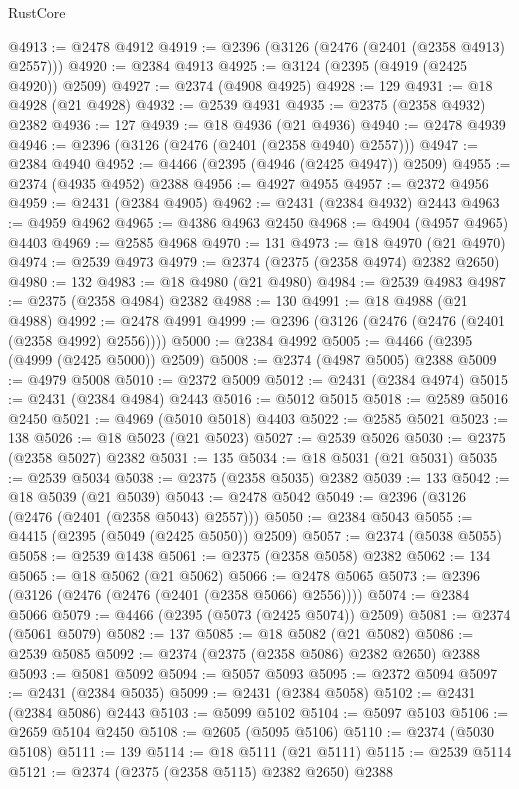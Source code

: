 \begin{lexlean}{RustCore}
\begin{coremodule}
@4913 := @2478 @4912
@4919 := @2396 (@3126 (@2476 (@2401 (@2358 @4913) @2557)))
@4920 := @2384 @4913
@4925 := @3124 (@2395 (@4919 (@2425 @4920)) @2509)
@4927 := @2374 (@4908 @4925)
@4928 := 129
@4931 := @18 @4928 (@21 @4928)
@4932 := @2539 @4931
@4935 := @2375 (@2358 @4932) @2382
@4936 := 127
@4939 := @18 @4936 (@21 @4936)
@4940 := @2478 @4939
@4946 := @2396 (@3126 (@2476 (@2401 (@2358 @4940) @2557)))
@4947 := @2384 @4940
@4952 := @4466 (@2395 (@4946 (@2425 @4947)) @2509)
@4955 := @2374 (@4935 @4952) @2388
@4956 := @4927 @4955
@4957 := @2372 @4956
@4959 := @2431 (@2384 @4905)
@4962 := @2431 (@2384 @4932) @2443
@4963 := @4959 @4962
@4965 := @4386 @4963 @2450
@4968 := @4904 (@4957 @4965) @4403
@4969 := @2585 @4968
@4970 := 131
@4973 := @18 @4970 (@21 @4970)
@4974 := @2539 @4973
@4979 := @2374 (@2375 (@2358 @4974) @2382 @2650)
@4980 := 132
@4983 := @18 @4980 (@21 @4980)
@4984 := @2539 @4983
@4987 := @2375 (@2358 @4984) @2382
@4988 := 130
@4991 := @18 @4988 (@21 @4988)
@4992 := @2478 @4991
@4999 := @2396 (@3126 (@2476 (@2476 (@2401 (@2358 @4992) @2556))))
@5000 := @2384 @4992
@5005 := @4466 (@2395 (@4999 (@2425 @5000)) @2509)
@5008 := @2374 (@4987 @5005) @2388
@5009 := @4979 @5008
@5010 := @2372 @5009
@5012 := @2431 (@2384 @4974)
@5015 := @2431 (@2384 @4984) @2443
@5016 := @5012 @5015
@5018 := @2589 @5016 @2450
@5021 := @4969 (@5010 @5018) @4403
@5022 := @2585 @5021
@5023 := 138
@5026 := @18 @5023 (@21 @5023)
@5027 := @2539 @5026
@5030 := @2375 (@2358 @5027) @2382
@5031 := 135
@5034 := @18 @5031 (@21 @5031)
@5035 := @2539 @5034
@5038 := @2375 (@2358 @5035) @2382
@5039 := 133
@5042 := @18 @5039 (@21 @5039)
@5043 := @2478 @5042
@5049 := @2396 (@3126 (@2476 (@2401 (@2358 @5043) @2557)))
@5050 := @2384 @5043
@5055 := @4415 (@2395 (@5049 (@2425 @5050)) @2509)
@5057 := @2374 (@5038 @5055)
@5058 := @2539 @1438
@5061 := @2375 (@2358 @5058) @2382
@5062 := 134
@5065 := @18 @5062 (@21 @5062)
@5066 := @2478 @5065
@5073 := @2396 (@3126 (@2476 (@2476 (@2401 (@2358 @5066) @2556))))
@5074 := @2384 @5066
@5079 := @4466 (@2395 (@5073 (@2425 @5074)) @2509)
@5081 := @2374 (@5061 @5079)
@5082 := 137
@5085 := @18 @5082 (@21 @5082)
@5086 := @2539 @5085
@5092 := @2374 (@2375 (@2358 @5086) @2382 @2650) @2388
@5093 := @5081 @5092
@5094 := @5057 @5093
@5095 := @2372 @5094
@5097 := @2431 (@2384 @5035)
@5099 := @2431 (@2384 @5058)
@5102 := @2431 (@2384 @5086) @2443
@5103 := @5099 @5102
@5104 := @5097 @5103
@5106 := @2659 @5104 @2450
@5108 := @2605 (@5095 @5106)
@5110 := @2374 (@5030 @5108)
@5111 := 139
@5114 := @18 @5111 (@21 @5111)
@5115 := @2539 @5114
@5121 := @2374 (@2375 (@2358 @5115) @2382 @2650) @2388

\end{coremodule}
\end{lexlean}
